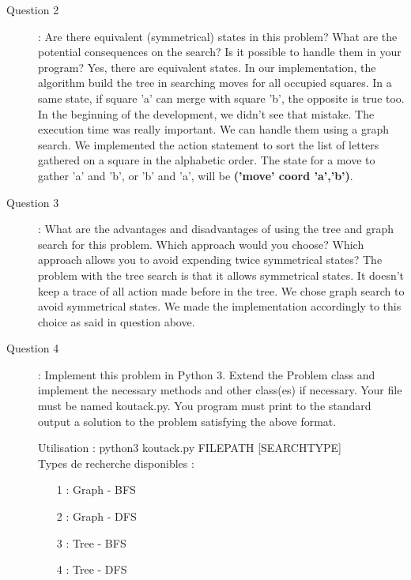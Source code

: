 \begin{description}
\begin{itemize}
\end{itemize}
\item[Question 2]: Are there equivalent (symmetrical) states in this problem? What are the potential consequences on the search? Is it possible to handle them in your program?\newline
Yes, there are equivalent states. In our implementation, the algorithm build the tree in searching moves for all occupied squares. In a same state, if square 'a' can merge with square 'b', the opposite is true too. In the beginning of the development, we didn't see that mistake. The execution time was really important. We can handle them using a graph search. We implemented the action statement to sort the list of letters gathered on a square in the alphabetic order. The state for a move to gather 'a' and 'b', or 'b' and 'a', will be \textbf{('move' coord {'a','b'})}.
\item[Question 3] : What are the advantages and disadvantages of using the tree and graph search for this problem. Which approach would you choose? Which approach allows you to avoid expending twice symmetrical states?\newline
The problem with the tree search is that it allows symmetrical states. It doesn't keep a trace of all action made before in the tree. We chose graph search to avoid symmetrical states. We made the implementation accordingly to this choice as said in question above. 
\item[Question 4]: Implement this problem in Python 3. Extend the Problem class and implement the necessary methods and other class(es) if necessary. Your file must be named koutack.py. You program must print to the standard output a solution to the problem satisfying the above format.\newline

Utilisation : python3 koutack.py FILEPATH [SEARCHTYPE] \\
Types de recherche disponibles :
\begin{itemize}
\item[1]: Graph - BFS
\item[2]: Graph - DFS
\item[3]: Tree - BFS
\item[4]: Tree - DFS
\end{itemize}
\end{description}

 

